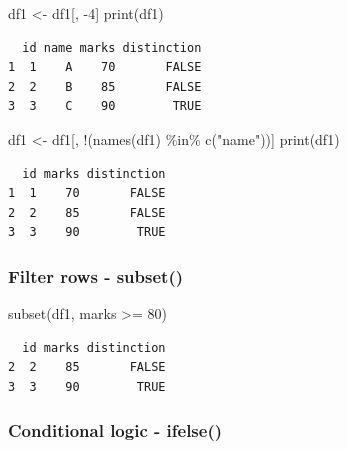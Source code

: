 \documentclass[
  letterpaper,
  DIV=11,
  numbers=noendperiod]{scrartcl}
\newenvironment{Shaded}{\begin{snugshade}}{\end{snugshade}}
\newcommand{\DecValTok}[1]{\textcolor[rgb]{0.68,0.00,0.00}{#1}}
\newcommand{\FunctionTok}[1]{\textcolor[rgb]{0.28,0.35,0.67}{#1}}
\newcommand{\NormalTok}[1]{\textcolor[rgb]{0.00,0.23,0.31}{#1}}
\newcommand{\OtherTok}[1]{\textcolor[rgb]{0.00,0.23,0.31}{#1}}
\newcommand{\SpecialCharTok}[1]{\textcolor[rgb]{0.37,0.37,0.37}{#1}}
\newcommand{\StringTok}[1]{\textcolor[rgb]{0.13,0.47,0.30}{#1}}
\begin{document}
\begin{Shaded}
\begin{Highlighting}[]
\NormalTok{df1 }\OtherTok{\textless{}{-}}\NormalTok{ df1[, }\SpecialCharTok{{-}}\DecValTok{4}\NormalTok{]}
\FunctionTok{print}\NormalTok{(df1)}
\end{Highlighting}
\end{Shaded}

\begin{verbatim}
  id name marks distinction
1  1    A    70       FALSE
2  2    B    85       FALSE
3  3    C    90        TRUE
\end{verbatim}

\begin{Shaded}
\begin{Highlighting}[]
\NormalTok{df1 }\OtherTok{\textless{}{-}}\NormalTok{ df1[, }\SpecialCharTok{!}\NormalTok{(}\FunctionTok{names}\NormalTok{(df1) }\SpecialCharTok{\%in\%} \FunctionTok{c}\NormalTok{(}\StringTok{"name"}\NormalTok{))]}
\FunctionTok{print}\NormalTok{(df1)}
\end{Highlighting}
\end{Shaded}

\begin{verbatim}
  id marks distinction
1  1    70       FALSE
2  2    85       FALSE
3  3    90        TRUE
\end{verbatim}

\subsubsection{Filter rows - subset()}\label{filter-rows---subset}

\begin{Shaded}
\begin{Highlighting}[]
\FunctionTok{subset}\NormalTok{(df1, marks }\SpecialCharTok{\textgreater{}=} \DecValTok{80}\NormalTok{)}
\end{Highlighting}
\end{Shaded}

\begin{verbatim}
  id marks distinction
2  2    85       FALSE
3  3    90        TRUE
\end{verbatim}

\subsubsection{Conditional logic -
ifelse()}\label{conditional-logic---ifelse}

\begin{Shaded}
\end{Shaded}
\end{document}
